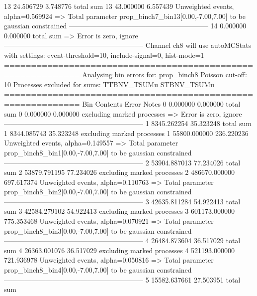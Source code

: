 13         24.506729       3.748776        total sum                     
13         43.000000       6.557439        Unweighted events, alpha=0.569924
  => Total parameter prop_binch7_bin13[0.00,-7.00,7.00] to be gaussian constrained
------------------------------------------------------------
14         0.000000        0.000000        total sum                     
  => Error is zero, ignore      
------------------------------------------------------------
Channel ch8 will use autoMCStats with settings: event-threshold=10, include-signal=0, hist-mode=1
============================================================
Analysing bin errors for: prop_binch8
Poisson cut-off: 10
Processes excluded for sums: TTBNV_TSUMu STBNV_TSUMu
============================================================
Bin        Contents        Error           Notes                         
0          0.000000        0.000000        total sum                     
0          0.000000        0.000000        excluding marked processes    
  => Error is zero, ignore      
------------------------------------------------------------
1          8345.262254     35.323248       total sum                     
1          8344.085743     35.323248       excluding marked processes    
1          55800.000000    236.220236      Unweighted events, alpha=0.149557
  => Total parameter prop_binch8_bin1[0.00,-7.00,7.00] to be gaussian constrained
------------------------------------------------------------
2          53904.887013    77.234026       total sum                     
2          53879.791195    77.234026       excluding marked processes    
2          486670.000000   697.617374      Unweighted events, alpha=0.110763
  => Total parameter prop_binch8_bin2[0.00,-7.00,7.00] to be gaussian constrained
------------------------------------------------------------
3          42635.811284    54.922413       total sum                     
3          42584.279102    54.922413       excluding marked processes    
3          601173.000000   775.353468      Unweighted events, alpha=0.070921
  => Total parameter prop_binch8_bin3[0.00,-7.00,7.00] to be gaussian constrained
------------------------------------------------------------
4          26484.873604    36.517029       total sum                     
4          26363.001076    36.517029       excluding marked processes    
4          521193.000000   721.936978      Unweighted events, alpha=0.050816
  => Total parameter prop_binch8_bin4[0.00,-7.00,7.00] to be gaussian constrained
------------------------------------------------------------
5          15582.637661    27.503951       total sum                     

